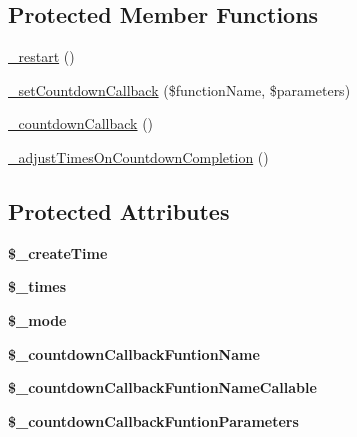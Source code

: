 \subsection*{Protected Member Functions}
\begin{DoxyCompactItemize}
\item 
\hyperlink{class_able_polecat___clock_aa9f35fe5fc8e8c4597b18a7b4c9d5222}{\+\_\+restart} ()
\item 
\hyperlink{class_able_polecat___clock_a1eb8ecab043c4ee4eb5cacb21f77b5c9}{\+\_\+set\+Countdown\+Callback} (\$function\+Name, \$parameters)
\item 
\hyperlink{class_able_polecat___clock_aca838fd7b45e2507cdc6cc21d372a261}{\+\_\+countdown\+Callback} ()
\item 
\hyperlink{class_able_polecat___clock_a2e188a9f13c5f98caf0475e53cd711fa}{\+\_\+adjust\+Times\+On\+Countdown\+Completion} ()
\end{DoxyCompactItemize}
\subsection*{Protected Attributes}
\begin{DoxyCompactItemize}
\item 
\hypertarget{class_able_polecat___clock_a0ecb7e25a147582d75cd44013e515bac}{}{\bfseries \$\+\_\+create\+Time}\label{class_able_polecat___clock_a0ecb7e25a147582d75cd44013e515bac}

\item 
\hypertarget{class_able_polecat___clock_aeb317fe3fd08d88ddf95de6318398f23}{}{\bfseries \$\+\_\+times}\label{class_able_polecat___clock_aeb317fe3fd08d88ddf95de6318398f23}

\item 
\hypertarget{class_able_polecat___clock_a591b2fac857402b7049ebb2ca47cdd34}{}{\bfseries \$\+\_\+mode}\label{class_able_polecat___clock_a591b2fac857402b7049ebb2ca47cdd34}

\item 
\hypertarget{class_able_polecat___clock_ad6afe7599d5c63851f3a57c1b37a4c98}{}{\bfseries \$\+\_\+countdown\+Callback\+Funtion\+Name}\label{class_able_polecat___clock_ad6afe7599d5c63851f3a57c1b37a4c98}

\item 
\hypertarget{class_able_polecat___clock_a7c2cf4f7718c08480a6b27834ba7c3b5}{}{\bfseries \$\+\_\+countdown\+Callback\+Funtion\+Name\+Callable}\label{class_able_polecat___clock_a7c2cf4f7718c08480a6b27834ba7c3b5}

\item 
\hypertarget{class_able_polecat___clock_afc220dca3bc4cd6ad4c6583e3892b184}{}{\bfseries \$\+\_\+countdown\+Callback\+Funtion\+Parameters}\label{class_able_polecat___clock_afc220dca3bc4cd6ad4c6583e3892b184}

\end{DoxyCompactItemize}


